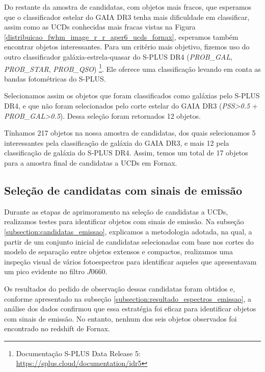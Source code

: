 Do restante da amostra de candidatas, com objetos mais fracos, que esperamos que o classificador estelar do GAIA DR3 tenha mais dificuldade em classificar, assim como as UCDs conhecidas mais fracas vistas na Figura \ref{distribuicao_fwhm_image_r_r_aper6_ucds_fornax}, esperamos também encontrar objetos interessantes. Para um critério mais objetivo, fizemos uso do outro classificador galáxia-estrela-quasar do S-PLUS DR4 (\textit{PROB\_GAL}, \textit{PROB\_STAR}, \textit{PROB\_QSO}) \citep{lili_classification}\footnote{Documentação S-PLUS Data Release 5: \url{https://splus.cloud/documentation/idr5}}. Ele oferece uma classificação levando em conta as bandas fotométricas do S-PLUS.

Selecionamos assim os objetos que foram classificados como galáxias pelo S-PLUS DR4, e que não foram selecionados pelo corte estelar do GAIA DR3 (\textit{PSS>0.5} + \textit{PROB\_GAL>0.5}). Dessa seleção foram retornados 12 objetos.

Tínhamos 217 objetos na nossa amostra de candidatas, dos quais selecionamos 5 interessantes pela classificação de galáxia do GAIA DR3, e mais 12 pela classificação de galáxia do S-PLUS DR4. Assim, temos um total de 17 objetos para a amostra final de candidatas a UCDs em Fornax.

\subsection{Seleção de candidatas com sinais de emissão} \label{subsec: candidatas_emissao}

Durante as etapas de aprimoramento na seleção de candidatas a UCDs, realizamos testes para identificar objetos com sinais de emissão. Na subseção \ref{subsection:candidatas_emissao}, explicamos a metodologia adotada, na qual, a partir de um conjunto inicial de candidatas selecionadas com base nos cortes do modelo de separação entre objetos extensos e compactos, realizamos uma inspeção visual de vários fotoespectros para identificar aqueles que apresentavam um pico evidente no filtro $J0660$.

Os resultados do pedido de observação dessas candidatas foram obtidos e, conforme apresentado na subseção \ref{subsection:resultado_espectros_emissao}, a análise dos dados confirmou que essa estratégia foi eficaz para identificar objetos com sinais de emissão. No entanto, nenhum dos seis objetos observados foi encontrado no redshift de Fornax.

